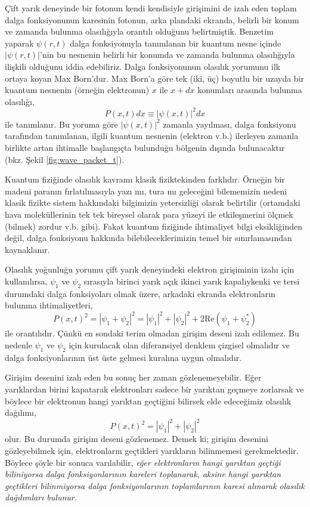 \documentclass[a4paper,12pt, twoside]{article}
\begin{document}
Çift yarık deneyinde bir fotonun kendi kendisiyle girişimini de izah eden toplam dalga fonksiyonunun karesinin fotonun, arka plandaki ekranda, belirli bir konum ve zamanda bulunma olasılığıyla orantılı olduğunu belirtmiştik. Benzetim yaparak $\psi(r,t)$ dalga fonksiyonuyla tanımlanan bir kuantum nesne içinde $|\psi(r,t)|$'nin bu nesnenin belirli bir konumda ve zamanda bulunma olasılığıyla ilişkili olduğunu iddia edebiliriz. Dalga fonksiyonunun olasılık yorumunu ilk ortaya koyan Max Born'dur. Max Born'a göre tek (iki, üç) boyutlu bir uzayda bir kuantum nesnenin (örneğin elektronun) $x$ ile $x+dx$ konumları arasında bulunma olasılığı,
\begin{equation}
P(x,t) dx \equiv |\psi(x,t)|^2 dx
\label{eq:probability_interp}
\end{equation}
ile tanımlanır. Bu yoruma göre $|\psi(x,t)|^2$ zamanla yayılması, dalga fonksiyonu tarafından tanımlanan, ilgili kuantum nesnenin (elektron v.b.) ilerleyen zamanla birlikte artan ihtimalle başlangıçta bulunduğu bölgenin dışında bulunacaktır (bkz. Şekil \ref{fig:wave_packet_t}).

Kuantum fiziğinde olasılık kavramı klasik fiziktekinden farklıdır. Örneğin bir madeni paranın fırlatılmasıyla yazı mı, tura mı geleceğini bilememizin nedeni klasik fizikte sistem hakkındaki bilgimizin yetersizliği olarak belirtilir (ortamdaki hava moleküllerinin tek tek bireysel olarak para yüzeyi ile etkileşmerini ölçmek (bilmek) zordur v.b. gibi). Fakat kuantum fiziğinde ihtimaliyet bilgi eksikliğinden değil, dalga fonksiyonu hakkında bilebileceklerimizin temel bir sınırlamasından kaynaklanır.

Olasılık yoğunluğu yorumu çift yarık deneyindeki elektron girişiminin izahı için kullanılırsa, $\psi_1$ ve $\psi_2$ sırasıyla birinci yarık açık ikinci yarık kapalıykenki ve tersi durumdaki dalga fonksiyoları olmak üzere, arkadaki ekranda elektronların bulunma ihtimaliyetleri,
\begin{equation}
P(x,t)^2 = |\psi_1 + \psi_2|^2 = |\psi_1 |^2 + |\psi_2|^2 + 2\text{Re}(\psi_1 + \psi_2^*)
\label{eq:interference_probability}
\end{equation}
ile orantılıdır. Çünkü en sondaki terim olmadan girişim deseni izah edilemez. Bu nedenle $\psi_1$ ve $\psi_2$ için kurulacak olan diferansiyel denklem çizgisel olmalıdır ve dalga fonksiyonlarının üst üste gelmesi kuralına uygun olmalıdır.

Girişim desenini izah eden bu sonuç her zaman gözlenemeyebilir. Eğer yarıklardan birini kapatarak elektronları sadece bir yarıktan geçmeye zorlarsak ve böylece bir elektronun hangi yarıktan geçtiğini bilirsek elde edeceğimiz olasılık dağılımı,
\begin{equation}
P(x,t)^2 = |\psi_1 |^2 + |\psi_2|^2
\label{eq:classical_probability}
\end{equation}
olur. Bu durumda girişim deseni gözlenemez. Demek ki; girişim desenini gözleyebilmek için, elektronların geçtikleri yarıkların bilinmemesi gerekmektedir. Böylece şöyle bir sonuca varılabilir, \emph{eğer elektronların hangi yarıktan geçtiği biliniyorsa dalga fonksiyonlarının kareleri toplanarak, aksine hangi yarıktan geçtikleri bilinmiyorsa dalga fonksiyonlarının toplamlarının karesi alınarak olasılık dağılımları bulunur.}
\end{document}
